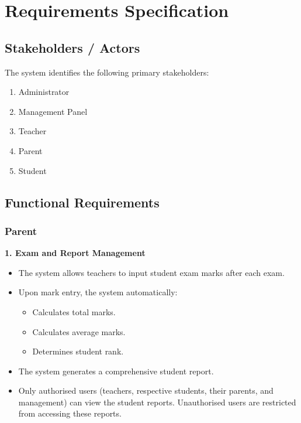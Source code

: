 \documentclass[12pt, a4paper]{report}
\begin{document}
\chapter{Requirements Specification}

\section{Stakeholders / Actors}

The system identifies the following primary stakeholders:
\begin{enumerate}
    \item Administrator
    \item Management Panel
    \item Teacher
    \item Parent
    \item Student
\end{enumerate}

\section{Functional Requirements}

\subsection{Parent}

\textbf{1. Exam and Report Management}
\begin{itemize}
    \item The system allows teachers to input student exam marks after each exam.
    \item Upon mark entry, the system automatically:
    \begin{itemize}
        \item Calculates total marks.
        \item Calculates average marks.
        \item Determines student rank.
    \end{itemize}
    \item The system generates a comprehensive student report.
    \item Only authorised users (teachers, respective students, their parents, and management) can view the student reports. Unauthorised users are restricted from accessing these reports.
\end{itemize}
\end{document}
